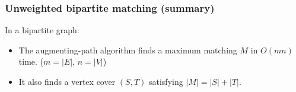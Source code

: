 \documentclass[14pt,aspectratio=169,xcolor=dvipsnames,table,onlytextwidth]{beamer}
\begin{document}
\begin{frame}
    \frametitle{Unweighted bipartite matching (summary)}

    \begin{theorem}
        In a bipartite graph:
        \begin{itemize}
            \setlength{\itemsep}{1em}
            \item The augmenting-path algorithm finds a maximum matching $M$ in $O(mn)$ time. \hfill {\footnotesize ($m = |E|$, $n = |V|$)}

            \item It also finds a vertex cover $(S,T)$ satisfying $|M| = |S| + |T|$.
        \end{itemize}
    \end{theorem}
\end{frame}

\end{document}
